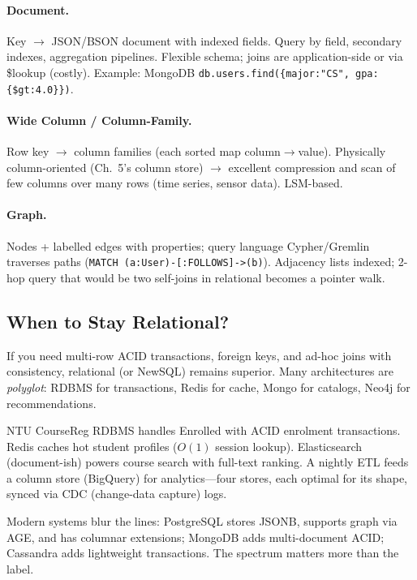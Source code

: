 \paragraph{Document.} Key $\to$ JSON/BSON document with indexed fields. Query by field, secondary indexes, aggregation pipelines. Flexible schema; joins are application-side or via \$lookup (costly). Example: MongoDB \texttt{db.users.find(\{major:"CS", gpa: \{\$gt:4.0\}\})}.

\paragraph{Wide Column / Column-Family.} Row key $\to$ column families (each sorted map column$\to$value). Physically column-oriented (Ch.~5's column store) $\to$ excellent compression and scan of few columns over many rows (time series, sensor data). LSM-based.

\paragraph{Graph.} Nodes + labelled edges with properties; query language Cypher/Gremlin traverses paths (\texttt{MATCH (a:User)-[:FOLLOWS]->(b)}). Adjacency lists indexed; 2-hop query that would be two self-joins in relational becomes a pointer walk.

\subsection{When to Stay Relational?}

If you need multi-row ACID transactions, foreign keys, and ad-hoc joins with consistency, relational (or NewSQL) remains superior. Many architectures are \emph{polyglot}: RDBMS for transactions, Redis for cache, Mongo for catalogs, Neo4j for recommendations.

\begin{example}
NTU CourseReg RDBMS handles Enrolled with ACID enrolment transactions. Redis caches hot student profiles ($O(1)$ session lookup). Elasticsearch (document-ish) powers course search with full-text ranking. A nightly ETL feeds a column store (BigQuery) for analytics---four stores, each optimal for its shape, synced via CDC (change-data capture) logs.
\end{example}

\begin{remark}[Convergence]
Modern systems blur the lines: PostgreSQL stores JSONB, supports graph via AGE, and has columnar extensions; MongoDB adds multi-document ACID; Cassandra adds lightweight transactions. The spectrum matters more than the label.
\end{remark}

